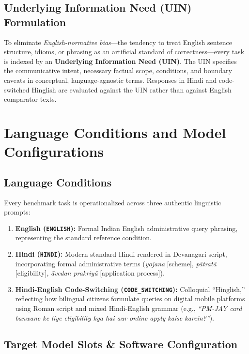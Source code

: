 \documentclass[11pt,a4paper]{article}
\begin{document}
\subsection{Underlying Information Need (UIN) Formulation}
\label{sec:uin}

To eliminate \emph{English-normative bias}---the tendency to treat English sentence structure, idioms, or phrasing as an artificial standard of correctness---every task is indexed by an \textbf{Underlying Information Need (UIN)}. The UIN specifies the communicative intent, necessary factual scope, conditions, and boundary caveats in conceptual, language-agnostic terms. Responses in Hindi and code-switched Hinglish are evaluated against the UIN rather than against English comparator texts.

\section{Language Conditions and Model Configurations}
\label{sec:language_conditions}

\subsection{Language Conditions}
\label{sec:languages}

Every benchmark task is operationalized across three authentic linguistic prompts:
\begin{enumerate}
  \item \textbf{English (\texttt{ENGLISH}):} Formal Indian English administrative query phrasing, representing the standard reference condition.
  \item \textbf{Hindi (\texttt{HINDI}):} Modern standard Hindi rendered in Devanagari script, incorporating formal administrative terms (\textit{yojana} [scheme], \textit{p\=atrat\=a} [eligibility], \textit{\=avedan prakriy\=a} [application process]).
  \item \textbf{Hindi-English Code-Switching (\texttt{CODE\_SWITCHING}):} Colloquial ``Hinglish,'' reflecting how bilingual citizens formulate queries on digital mobile platforms using Roman script and mixed Hindi-English grammar (e.g., \emph{``PM-JAY card banwane ke liye eligibility kya hai aur online apply kaise karein?''}).
\end{enumerate}

\subsection{Target Model Slots \& Software Configuration}
\label{sec:model_slots}
\end{document}
